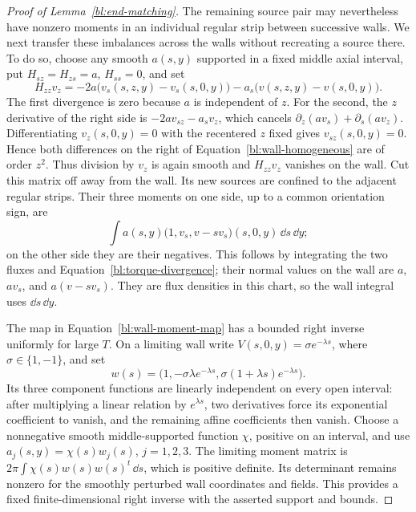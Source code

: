 \begin{proof}[Proof of Lemma~\ref{bl:end-matching}]
The remaining source pair may nevertheless have nonzero moments in an
individual regular strip between successive walls.  We next transfer
these imbalances across the walls without recreating a source there.
To do so, choose any smooth $a(s,y)$ supported in a fixed middle axial
interval, put $H_{sz}=H_{zs}=a$, $H_{ss}=0$, and set
\begin{equation}\label{bl:wall-homogeneous}
 H_{zz}v_z=
 -2a\bigl(v_s(s,z,y)-v_s(s,0,y)\bigr)
 -a_s\bigl(v(s,z,y)-v(s,0,y)\bigr).
\end{equation}
The first divergence is zero because $a$ is independent of $z$.  For
the second, the $z$ derivative of the right side is
$-2a v_{sz}-a_s v_z$, which cancels
$\partial_z(a v_s)+\partial_s(a v_z)$.
Differentiating $v_z(s,0,y)=0$ with the recentered $z$ fixed gives
$v_{sz}(s,0,y)=0$.  Hence both differences on the right of
Equation~\eqref{bl:wall-homogeneous} are of order $z^2$.
Thus division by $v_z$ is again smooth and $H_{zz}v_z$ vanishes on
the wall.  Cut this matrix off away from the wall.  Its new sources
are confined to the adjacent regular strips.  Their three moments on
one side, up to a common orientation sign, are
\begin{equation}\label{bl:wall-moment-map}
 \int a(s,y)\bigl(1,v_s,v-sv_s\bigr)(s,0,y)\,\dd s\,\dd y;
\end{equation}
on the other side they are their negatives.  This follows by integrating
the two fluxes and Equation~\eqref{bl:torque-divergence}; their normal
values on the wall are $a$, $av_s$, and $a(v-sv_s)$.  They are flux
densities in this chart, so the wall integral uses $\dd s\,\dd y$.

The map in Equation~\eqref{bl:wall-moment-map} has a bounded right inverse
uniformly for large $T$.  On a limiting wall write
$V(s,0,y)=\sigma e^{-\lambda s}$, where $\sigma\in\{1,-1\}$, and set
\[
 w(s)=\bigl(1,-\sigma\lambda e^{-\lambda s},
                    \sigma(1+\lambda s)e^{-\lambda s}\bigr).
\]
Its three component functions are linearly independent on every open
interval: after multiplying a linear relation by $e^{\lambda s}$,
two derivatives force its exponential coefficient to vanish, and the
remaining affine coefficients then vanish.  Choose a nonnegative smooth
middle-supported function $\chi$, positive on an interval, and use
$a_j(s,y)=\chi(s)w_j(s)$, $j=1,2,3$.  The limiting moment matrix is
$2\pi\int\chi(s)w(s)w(s)^t\,\dd s$, which is positive definite.
Its determinant remains nonzero for the smoothly perturbed wall
coordinates and fields.  This provides a fixed finite-dimensional
right inverse with the asserted support and bounds.


\end{proof}
